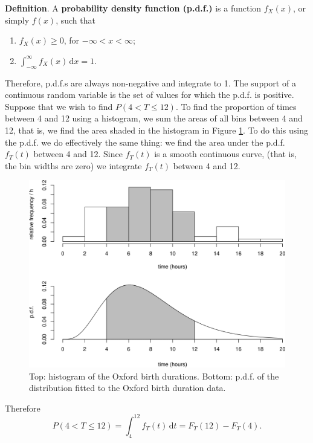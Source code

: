 \documentclass[
  british,
]{book}
\providecommand{\tightlist}{%
  \setlength{\itemsep}{0pt}\setlength{\parskip}{0pt}}
\begin{document}
\textbf{Definition}. A \textbf{probability density function (p.d.f.)} is a function \(f_{X}(x)\), or simply \(f(x)\), such that

\begin{enumerate}
\def\labelenumi{\arabic{enumi}.}
\tightlist
\item
  \(f_X(x) \geq 0\), for \(-\infty < x < \infty\);
\item
  \(\displaystyle\int_{-\infty}^{\infty} f_X(x) \, \mathrm{d}x = 1\).
\end{enumerate}

Therefore, p.d.f.s are always non-negative and integrate to 1. The support of a continuous random variable is the set of values for which the p.d.f. is positive. Suppose that we wish to find \(P(4 < T \leq 12)\). To find the proportion of times between 4 and 12 using a histogram, we sum the areas of all bins between 4 and 12, that is, we find the area shaded in the histogram in Figure \ref{fig:oxshady}. To do this using the p.d.f. we do effectively the same thing: we find the area under the p.d.f. \(f_T(t)\) between 4 and 12. Since \(f_T(t)\) is a smooth continuous curve, (that is, the bin widths are zero) we integrate \(f_T(t)\) between 4 and 12.

\begin{figure}

{\centering \includegraphics[width=0.8\linewidth]{images/ox_shady} 

}

\caption{Top: histogram of the Oxford birth durations. Bottom: p.d.f. of the distribution fitted to the Oxford birth duration data.}\label{fig:oxshady}
\end{figure}
\FloatBarrier

Therefore
\[ P(4 < T \leq 12) = \displaystyle\int_4^{12} f_T(t) \,\mathrm{d}t = F_T(12)-F_T(4). \]
\end{document}
